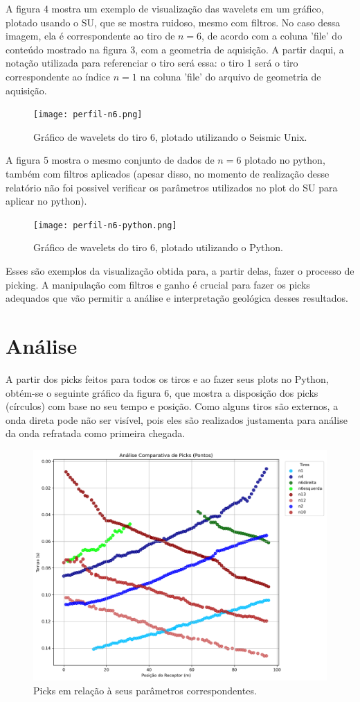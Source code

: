 \documentclass[a4paper,12pt]{article}
\begin{document}
A figura 4 mostra um exemplo de visualização das wavelets em um gráfico, plotado usando o SU, que se mostra ruidoso, mesmo com filtros. No caso dessa imagem, ela é correspondente ao tiro de $n=6$, de acordo com a coluna 'file' do conteúdo mostrado na figura 3, com a geometria de aquisição. A partir daqui, a notação utilizada para referenciar o tiro será essa: o tiro 1 será o tiro correspondente ao índice $n=1$ na coluna 'file' do arquivo de geometria de aquisição. 


\begin{figure}[h]
    \centering
    \texttt{[image: perfil-n6.png]}
    \caption{Gráfico de wavelets do tiro 6, plotado utilizando o Seismic Unix.}
    \label{fig:placeholder}
\end{figure}

A figura 5 mostra o mesmo conjunto de dados de $n=6$ plotado no python, também com filtros aplicados (apesar disso, no momento de realização desse relatório não foi possivel verificar os parâmetros utilizados no plot do SU para aplicar no python). 

\begin{figure}[h]
    \centering
    \texttt{[image: perfil-n6-python.png]}
    \caption{Gráfico de wavelets do tiro 6, plotado utilizando o Python.}
    \label{fig:placeholder}
\end{figure}

Esses são exemplos da visualização obtida para, a partir delas, fazer o processo de picking. A manipulação com filtros e ganho é crucial para fazer os picks adequados que vão permitir a análise e interpretação geológica desses resultados. 

\section{Análise}

A partir dos picks feitos para todos os tiros e ao fazer seus plots no Python, obtém-se o seguinte gráfico da figura 6, que mostra a disposição dos picks (círculos) com base no seu tempo e posição. Como alguns tiros são externos, a onda direta pode não ser visível, pois eles são realizados justamenta para análise da onda refratada como primeira chegada. 

\begin{figure}[h]
    \centering
    \includegraphics[width=0.5\linewidth]{analise_comparativa_picks.png}
    \caption{Picks em relação à seus parâmetros correspondentes.}
    \label{fig:placeholder}
\end{figure}
\end{document}
